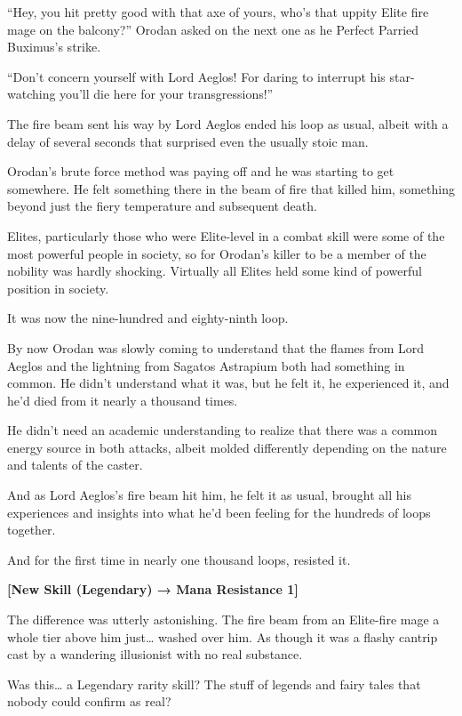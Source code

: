 \documentclass[a4paper,10pt]{book}
\begin{document}
“Hey, you hit pretty good with that axe of yours, who’s that uppity Elite fire mage on the balcony?” Orodan asked on the next one as he Perfect Parried Buximus’s strike.\par
“Don’t concern yourself with Lord Aeglos! For daring to interrupt his star-watching you’ll die here for your transgressions!”\par
The fire beam sent his way by Lord Aeglos ended his loop as usual, albeit with a delay of several seconds that surprised even the usually stoic man.\par
Orodan’s brute force method was paying off and he was starting to get somewhere. He felt something there in the beam of fire that killed him, something beyond just the fiery temperature and subsequent death.\par
Elites, particularly those who were Elite-level in a combat skill were some of the most powerful people in society, so for Orodan’s killer to be a member of the nobility was hardly shocking. Virtually all Elites held some kind of powerful position in society.\par
\par
It was now the nine-hundred and eighty-ninth loop.\par
By now Orodan was slowly coming to understand that the flames from Lord Aeglos and the lightning from Sagatos Astrapium both had something in common. He didn’t understand what it was, but he felt it, he experienced it, and he’d died from it nearly a thousand times.\par
He didn’t need an academic understanding to realize that there was a common energy source in both attacks, albeit molded differently depending on the nature and talents of the caster.\par
And as Lord Aeglos’s fire beam hit him, he felt it as usual, brought all his experiences and insights into what he’d been feeling for the hundreds of loops together.\par
And for the first time in nearly one thousand loops, resisted it.\par
\textbf{[New Skill (Legendary) → Mana Resistance 1]}\par
The difference was utterly astonishing. The fire beam from an Elite-fire mage a whole tier above him just… washed over him. As though it was a flashy cantrip cast by a wandering illusionist with no real substance.\par
Was this… a Legendary rarity skill? The stuff of legends and fairy tales that nobody could confirm as real?\par
\end{document}
